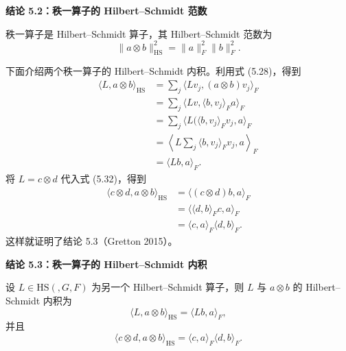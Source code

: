 \par\medskip{}
\noindent\textbf{结论 5.2：秩一算子的 Hilbert–Schmidt 范数}\par
秩一算子是 Hilbert–Schmidt 算子，其 Hilbert–Schmidt 范数为
\begin{equation}
\lVert a\otimes b\rVert_{\mathrm{HS}}^2=\lVert a\rVert_F^2\lVert b\rVert_F^2.
\tag{5.31}
\end{equation}

下面介绍两个秩一算子的 Hilbert–Schmidt 内积。利用式 (5.28)，得到
\begin{equation}
\begin{aligned}
\langle L,a\otimes b\rangle_{\mathrm{HS}}
&=\sum_j\langle Lv_j,(a\otimes b)v_j\rangle_F\\
&=\sum_j\langle Lv,\langle b,v_j\rangle_Fa\rangle_F\\
&=\sum_j\langle L(\langle b,v_j\rangle_Fv_j,a\rangle_F\\
&=\left\langle L\sum_j\langle b,v_j\rangle_Fv_j,a\right\rangle_F\\
&=\langle Lb,a\rangle_F.
\end{aligned}
\tag{5.32}
\end{equation}
将 $L=c\otimes d$ 代入式 (5.32)，得到
\begin{equation}
\begin{aligned}
\langle c\otimes d,a\otimes b\rangle_{\mathrm{HS}}
&=\langle(c\otimes d)b,a\rangle_F\\
&=\langle\langle d,b\rangle_Fc,a\rangle_F\\
&=\langle c,a\rangle_F\langle d,b\rangle_F.
\end{aligned}
\tag{5.33}
\end{equation}
这样就证明了结论 5.3（Gretton 2015）。

\par\medskip{}
\noindent\textbf{结论 5.3：秩一算子的 Hilbert–Schmidt 内积}\par
设 $L\in\mathrm{HS}(,G,F)$ 为另一个 Hilbert–Schmidt 算子，则 $L$ 与 $a\otimes b$ 的 Hilbert–Schmidt 内积为
\begin{equation}
\langle L,a\otimes b\rangle_{\mathrm{HS}}=\langle Lb,a\rangle_F,
\tag{5.34}
\end{equation}
并且
\begin{equation}
\langle c\otimes d,a\otimes b\rangle_{\mathrm{HS}}=\langle c,a\rangle_F\langle d,b\rangle_F.
\tag{5.35}
\end{equation}

